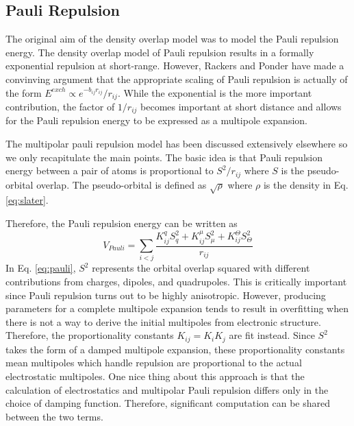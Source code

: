 \documentclass[journal=jacsat,manuscript=article]{achemso}
\begin{document}
\subsection*{Pauli Repulsion}
The original aim of the density overlap model was to model the
Pauli repulsion energy.\cite{wallqvist1989new,wheatley1990overlap,gordon1996approximate}
The density overlap model of Pauli repulsion results in a formally exponential
repulsion at short-range.
However, Rackers and Ponder have made a convinving argument that the appropriate
scaling of Pauli repulsion is actually of the form $E^{exch}\propto e^{-b_{ij}r_{ij}}/r_{ij}$.\cite{rackers2019classical,rackers2021polarizable}
While the exponential is the more important contribution, the factor of $1/r_{ij}$
becomes important at short distance and allows for the Pauli repulsion energy
to be expressed as a multipole expansion.

The multipolar pauli repulsion model has been discussed extensively elsewhere\cite{rackers2019classical}
so we only recapitulate the main points. The basic idea is that Pauli repulsion energy
between a pair of atoms is proportional to $S^2/r_{ij}$ where $S$ is the pseudo-orbital
overlap. The pseudo-orbital is defined as $\sqrt{\rho}$ where $\rho$ is the density in Eq. \ref{eq:slater}.

Therefore, the Pauli repulsion energy can be written as
\begin{equation}
  V_{Pauli}=\sum_{i<j}\frac{K_{ij}^q S^2_{q}+K_{ij}^\mu S^2_{\mu}+K_{ij}^\Theta S^2_{\Theta}}{r_{ij}}
\label{eq:pauli}
\end{equation}
\noindent
In Eq. \ref{eq:pauli}, $S^2$ represents the orbital overlap squared with different contributions
from charges, dipoles, and quadrupoles. This is critically important since Pauli repulsion
turns out to be highly anisotropic. However, producing parameters for a complete multipole expansion
tends to result in overfitting when there is not a way to derive the initial multipoles
from electronic structure. Therefore, the proportionality constants $K_{ij}=K_iK_j$ are fit instead.
Since $S^2$ takes the form of a damped multipole expansion\cite{rackers2019classical}, these proportionality
constants mean multipoles which handle repulsion are proportional to the actual electrostatic
multipoles. One nice thing about this approach is that the calculation of electrostatics and
multipolar Pauli repulsion differs only in the choice of damping function. Therefore, significant
computation can be shared between the two terms.
\end{document}
